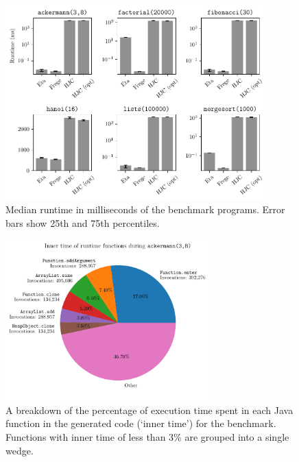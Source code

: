 \documentclass[dissertation.tex]{subfiles}
\begin{document}
{{        \begin{minipage}[t]{\textwidth}
        \begin{figure}[H]
            \centering
            \captionsetup{width=0.8\textwidth}
            \includegraphics[width=0.9\textwidth]{graphs/perf.pdf}
            \caption{Median runtime in milliseconds of the benchmark programs. Error bars show 25th and 75th percentiles.}
            \label{fig:perf}
        \end{figure}
        \begin{figure}[H]
            \centering
            \captionsetup{width=0.9\textwidth}
            \includegraphics[width=0.7\textwidth]{graphs/perf_profile_ackermann.pdf}
            \caption{A breakdown of the percentage of execution time spent in each Java function in the generated code (`inner time') for the  benchmark. Functions with inner time of less than 3\% are grouped into a single wedge.}
            \label{fig:inner-time}
        \end{figure}
        \end{minipage}

}}
\end{document}
